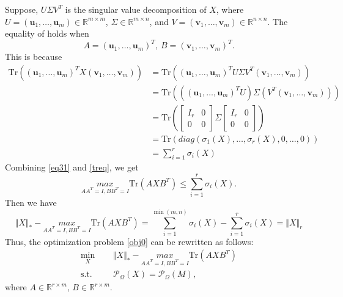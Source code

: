 \documentclass{article}
\begin{document}
{Suppose, $U\Sigma V^T$ is the singular value decomposition of $X$, where $U = (\bm u_1,\dots,\bm u_m) \in \mathbb{R}^{m \times m}$, $\Sigma \in \mathbb{R}^{m \times n}$, and $V = (\bm v_1,\dots,\bm v_m) \in \mathbb{R}^{n \times n}$. The equality of holds when 
\begin{equation}
	\label{}
	A = (\bm u_1,\dots,\bm u_m)^T, \ B = (\bm v_1,\dots,\bm v_m)^T.
\end{equation}
This is because
\begin{equation}
	\begin{aligned}
		\label{treq}
		\text{Tr} ((\bm u_1,\dots,\bm u_m)^TX(\bm v_1,\dots,\bm v_m))
		& = \text{Tr} ((\bm u_1,\dots,\bm u_m)^TU\Sigma V^T(\bm v_1,\dots,\bm v_m)) \\
		& = \text{Tr} (((\bm u_1,\dots,\bm u_m)^TU) \Sigma (V^T(\bm v_1,\dots,\bm v_m))) \\
		& = \text{Tr} \left( \begin{bmatrix}
			I_r & 0\\
			0 & 0 
		\end{bmatrix} \Sigma \begin{bmatrix}
			I_r & 0\\
			0 & 0 
		\end{bmatrix}
		\right) \\
		& = \text{Tr}(diag(\sigma_1(X),\dots,\sigma_r(X),0,\dots,0)) \\
		& = \sum_{i=1}^r \sigma_i(X)	
	\end{aligned}
\end{equation}
Combining \eqref{eq31} and \eqref{treq}, we get
\begin{equation}
	\underset{AA^T=I,BB^T=I}{max} \text{Tr}(AXB^T) \leq \sum_{i=1}^r \sigma_i(X).
\end{equation}
Then we have 
\begin{equation}
	\Vert X\Vert_* - \underset{AA^T=I,BB^T=I}{max} \text{Tr}(AXB^T)  
		= \sum_{i=1}^{\min(m,n)} \sigma_i(X) - \sum_{i=1}^r \sigma_i(X) 
		= \Vert X\Vert_r
\end{equation}
Thus, the optimization problem \eqref{obj0} can be rewritten as follows:
\begin{equation}
\begin{aligned}
	\label{obj1}
	\underset{X}{\text{min}} \ \ \ \ &  \ \  \Vert X\Vert_* - \underset{AA^T=I,BB^T=I}{max} \text{Tr}(AXB^T) \\
	\text{s.t.} \ \ \ \ &  \ \  \mathcal{P}_{\Omega}(X) =  \mathcal{P}_{\Omega}(M),
\end{aligned}
\end{equation}
where $A \in \mathbb{R}^{r \times m}$, $B \in \mathbb{R}^{r \times m}$.

}
\end{document}
